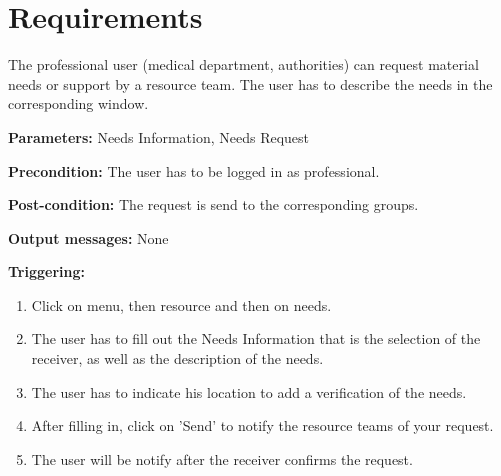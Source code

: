 \section{Requirements}
\label{operation:Requirements}
The professional user (medical department, authorities) can
request material needs or support by a resource team. The user has to describe
the needs in the corresponding window.\\
\begin{description}
\item \textbf{Parameters:} Needs Information, Needs Request
\item \textbf{Precondition:} The user has to be logged in as professional.
\item \textbf{Post-condition:}  The request is send to the corresponding groups.
\item \textbf{Output messages:} None
\item \textbf{Triggering:}
\begin{enumerate}
\item Click on menu, then resource and then on needs.
\item The user has to fill out the Needs Information that is the selection of
the receiver, as well as the description of the needs.
\item The user has to indicate his location to add a verification of the needs. 
\item After filling in, click on 'Send' to notify the resource teams of your
request.
\item The user will be notify after the receiver confirms the request. 
\end{enumerate}
\end{description}



